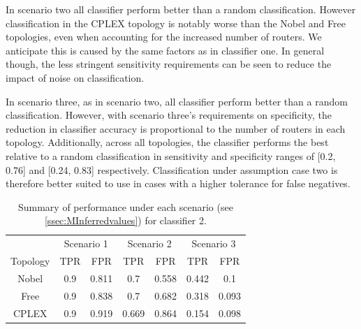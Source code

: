 In scenario two all classifier perform better than a random classification. However classification in the CPLEX topology is notably worse than the Nobel and Free topologies, even when accounting for the increased number of routers. We anticipate this is caused by the same factors as in classifier one. In general though, the less stringent sensitivity requirements can be seen to reduce the impact of noise on classification.\par
In scenario three, as in scenario two, all classifier perform better than a random classification. However, with scenario three's requirements on specificity, the reduction in classifier accuracy is proportional to the number of routers in each topology. Additionally, across all topologies, the classifier performs the best relative to a random classification in sensitivity and specificity ranges of [0.2, 0.76] and [0.24, 0.83] respectively. Classification under assumption case two is therefore better suited to use in cases with a higher tolerance for false negatives.\par
\begin{table}[H]
    \centering
    \begin{tabular}{ccccccc}
        & \multicolumn{2}{c}{Scenario 1} & \multicolumn{2}{c}{Scenario 2} & \multicolumn{2}{c}{Scenario 3}\\
        \cmidrule(lr){2-3} \cmidrule(lr){4-5} \cmidrule(lr){6-7}
        Topology & TPR & FPR & TPR & FPR & TPR & FPR\\
        \midrule
        Nobel & 0.9 & 0.811 & 0.7   & 0.558 & 0.442 & 0.1 \\
        Free  & 0.9 & 0.838 & 0.7   & 0.682 & 0.318 & 0.093 \\
        CPLEX & 0.9 & 0.919 & 0.669 & 0.864 & 0.154 & 0.098 \\
    \end{tabular}
    \caption{Summary of performance under each scenario (see \cref{ssec:MInferredvalues}) for classifier 2.}
    \label{tbl:Rassumptionset2summary}
\end{table}
\noindent
